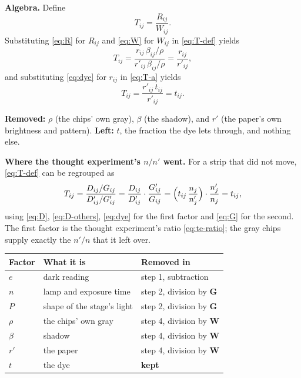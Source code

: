 \documentclass[11pt,letter]{article}
\newcommand{\iG}{\mathbf{G}}   %
\newcommand{\iW}{\mathbf{W}}   %
\begin{document}
\textbf{Algebra.}  Define
\begin{equation}
  T_{ij} = \frac{R_{ij}}{W_{ij}} .
  \label{eq:T-def}
\end{equation}
Substituting \eqref{eq:R} for $R_{ij}$ and \eqref{eq:W} for $W_{ij}$ in
\eqref{eq:T-def} yields
\begin{equation}
  T_{ij} = \frac{r_{ij}\, \beta_{ij} / \rho}{r'_{ij}\, \beta_{ij} / \rho}
         = \frac{r_{ij}}{r'_{ij}} ,
  \label{eq:T-a}
\end{equation}
and substituting \eqref{eq:dye} for $r_{ij}$ in \eqref{eq:T-a} yields
\begin{equation}
  T_{ij} = \frac{r'_{ij}\, t_{ij}}{r'_{ij}} = t_{ij} .
  \label{eq:T}
\end{equation}

\textbf{Removed:} $\rho$ (the chips' own gray), $\beta$ (the shadow), and $r'$
(the paper's own brightness and pattern).  \textbf{Left:} $t$, the
fraction the dye lets through, and nothing else.

\textbf{Where the thought experiment's $n/n'$ went.}  For a strip that did
not move, \eqref{eq:T-def} can be regrouped as
\begin{equation}
  T_{ij} = \frac{D_{ij}/G_{ij}}{D'_{ij}/G'_{ij}}
         = \frac{D_{ij}}{D'_{ij}} \cdot \frac{G'_{ij}}{G_{ij}}
         = \Bigl(t_{ij}\,\frac{n_j}{n'_j}\Bigr) \cdot
           \frac{n'_j}{n_j}
         = t_{ij} ,
  \label{eq:T-check}
\end{equation}
using \eqref{eq:D}, \eqref{eq:D-others}, \eqref{eq:dye} for the first
factor and \eqref{eq:G} for the second.  The first factor is the thought
experiment's ratio \eqref{eq:te-ratio}; the gray chips supply exactly the
$n'/n$ that it left over.

\medskip
\begin{center}
\begin{tabular}{@{}lll@{}}
\toprule
Factor & What it is & Removed in \\
\midrule
$e$ & dark reading & step 1, subtraction \\
$n$ & lamp and exposure time & step 2, division by $\iG$ \\
$P$ & shape of the stage's light & step 2, division by $\iG$ \\
$\rho$ & the chips' own gray & step 4, division by $\iW$ \\
$\beta$ & shadow & step 4, division by $\iW$ \\
$r'$ & the paper & step 4, division by $\iW$ \\
\midrule
$t$ & the dye & \textbf{kept} \\
\bottomrule
\end{tabular}
\end{center}
\end{document}

